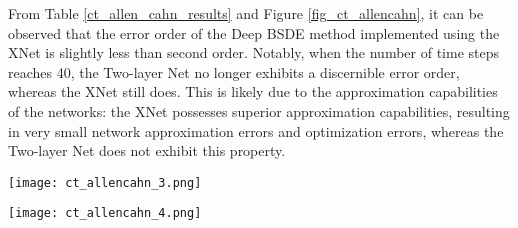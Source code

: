 \documentclass[11pt]{article}
\begin{document}
\begin{table}
	\centering
	\caption{Numerical Results for Allen-Can Equation}
	\label{ct_allen_cahn_results}
\end{table}

From Table \ref{ct_allen_cahn_results} and Figure \ref{fig_ct_allencahn}, it can be observed that the error order of the Deep BSDE method implemented using the XNet is slightly less than second order. Notably, when the number of time steps reaches 40, the Two-layer Net no longer exhibits a discernible error order, whereas the XNet still does. This is likely due to the approximation capabilities of the networks: the XNet possesses superior approximation capabilities, resulting in very small network approximation errors and optimization errors, whereas the Two-layer Net does not exhibit this property.



\begin{figure*}
	\centering
	\begin{minipage}[t]{0.478\linewidth}
		\centering
		\texttt{[image: ct\_allencahn\_3.png]}
		\label{fig_ct_allencahn_10:first}
	\end{minipage}%
	\hfill
	\begin{minipage}[t]{0.5\linewidth}
		\centering
		\texttt{[image: ct\_allencahn\_4.png]}
		\label{fig_ct_allencahn_160:second}
	\end{minipage}
	\vspace{-0.7cm}
	\centering
	\caption{Results of solving the Allen-Cahn Equation using the Deep BSDE method by XNet under $N$-time-step discretization, with $N=10$, $40$, and $160$.}
	\label{fig_ct_allencahn}
\end{figure*}
\end{document}
